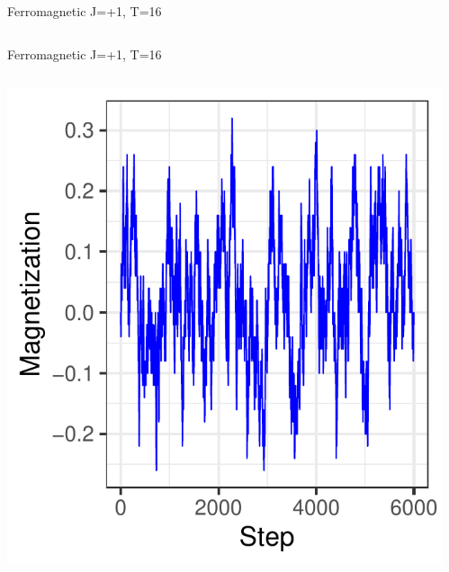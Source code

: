 \documentclass{beamer}
\begin{document}
\begin{frame}{Ferromagnetic J=+1, T=16}
\begin{columns}
\begin{column}{0.5\textwidth}
\begin{center}
     \end{center}
\end{column}
\end{columns}
\end{frame}

\begin{frame}{Ferromagnetic J=+1, T=16}
\begin{columns}
\begin{column}{0.5\textwidth}
    \begin{center}
     \includegraphics[width=\textwidth]{Pic/J+1_10_2500_T=16_Magnetization.pdf}
     \end{center}
\end{column}
\begin{column}{0.5\textwidth}
    \begin{center}

\end{center}
\end{column}
\end{columns}
\end{frame}
\end{document}
